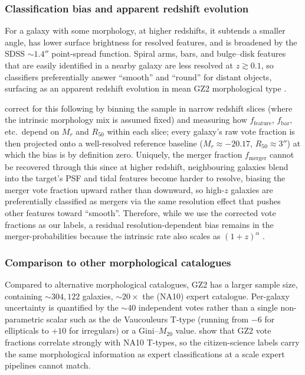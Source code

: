 \documentclass[10pt,preprint2]{aastex}
\begin{document}
\subsubsection{Classification bias and apparent redshift evolution}

For a galaxy with some morphology, at higher redshifts, it subtends a smaller angle, has lower surface brightness for resolved features, and is broadened by the SDSS $\sim 1.4''$ point-spread function. Spiral arms, bars, and bulge--disk features that are easily identified in a nearby galaxy are less resolved at $z \gtrsim 0.1$, so classifiers preferentially answer ``smooth'' and ``round'' for distant objects, surfacing as an apparent redshift evolution in mean GZ2 morphological type \citep{Bamford2009}. 

\citet{Willett2013} correct for this following \citet{Bamford2009} by binning the sample in narrow redshift slices (where the intrinsic morphology mix is assumed fixed) and measuring how $f_{\mathrm{feature}}$, $f_{\mathrm{bar}}$, etc.\ depend on $M_r$ and $R_{50}$ within each slice; every galaxy's raw vote fraction is then projected onto a well-resolved reference baseline ($M_r \approx -20.17$, $R_{50} \approx 3''$) at which the bias is by definition zero. Uniquely, the merger fraction $f_{\mathrm{merger}}$ cannot be recovered through this since at higher redshift, neighbouring galaxies blend into the target's PSF and tidal features become harder to resolve, biasing the merger vote fraction upward rather than downward, so high-$z$ galaxies are preferentially classified as mergers via the same resolution effect that pushes other features toward ``smooth''. Therefore, while we use the corrected vote fractions as our labels, a residual resolution-dependent bias remains in the merger-probabilities because the intrinsic rate also scales as $(1+z)^\alpha$ \citep{Lotz2011, RodriguezGomez2015}.

\subsubsection{Comparison to other morphological catalogues}

Compared to alternative morphological catalogues, GZ2 has a larger sample size, containing $\sim 304{,}122$ galaxies, $\sim 20\times$ the \citet{NairAbraham2010} (NA10) expert catalogue. Per-galaxy uncertainty is quantified by the $\sim 40$ independent votes rather than a single non-parametric scalar such as the de Vaucouleurs T-type (running from $-6$ for ellipticals to $+10$ for irregulars) or a Gini--$M_{20}$ value. \citet{Willett2013} show that GZ2 vote fractions correlate strongly with NA10 T-types, so the citizen-science labels carry the same morphological information as expert classifications at a scale expert pipelines cannot match.
\end{document}
